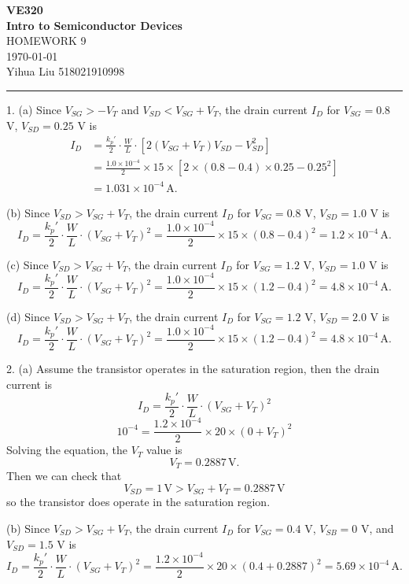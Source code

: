 \documentclass[a4paper]{article}
\begin{document}
\begin{center}
\huge
\textbf{VE320\\Intro to Semiconductor Devices\\}
\Large
\vspace{30pt}
\uppercase{Homework 9}\\
\vspace{5pt}\today\\
\vspace{5pt}
Yihua Liu 518021910998
\vspace{5pt}
\rule[-10pt]{.97\linewidth}{0.05em}
\end{center}
1. (a) Since $V_{SG}>-V_T$ and $V_{SD}<V_{SG}+V_T$, the drain current $I_D$ for $V_{SG}=0.8$ V, $V_{SD}=0.25$ V is
\[
    \begin{aligned}    
        I_D&=\frac{k_p'}{2}\cdot\frac{W}{L}\cdot\left[2\left(V_{SG}+V_T\right)V_{SD}-V_{SD}^2\right]\\
        &=\frac{1.0\times10^{-4}}{2}\times15\times\left[2\times\left(0.8-0.4\right)\times0.25-0.25^2\right]\\
        &=1.031\times10^{-4}\,\text{A}.
    \end{aligned}
\]

(b) Since $V_{SD}>V_{SG}+V_T$, the drain current $I_D$ for $V_{SG}=0.8$ V, $V_{SD}=1.0$ V is
\[I_D=\frac{k_p'}{2}\cdot\frac{W}{L}\cdot\left(V_{SG}+V_T\right)^2=\frac{1.0\times10^{-4}}{2}\times15\times\left(0.8-0.4\right)^2=1.2\times10^{-4}\,\text{A}.\]

(c) Since $V_{SD}>V_{SG}+V_T$, the drain current $I_D$ for $V_{SG}=1.2$ V, $V_{SD}=1.0$ V is
\[I_D=\frac{k_p'}{2}\cdot\frac{W}{L}\cdot\left(V_{SG}+V_T\right)^2=\frac{1.0\times10^{-4}}{2}\times15\times\left(1.2-0.4\right)^2=4.8\times10^{-4}\,\text{A}.\]

(d) Since $V_{SD}>V_{SG}+V_T$, the drain current $I_D$ for $V_{SG}=1.2$ V, $V_{SD}=2.0$ V is
\[I_D=\frac{k_p'}{2}\cdot\frac{W}{L}\cdot\left(V_{SG}+V_T\right)^2=\frac{1.0\times10^{-4}}{2}\times15\times\left(1.2-0.4\right)^2=4.8\times10^{-4}\,\text{A}.\]

2. (a) Assume the transistor operates in the saturation region, then the drain current is
\[I_D=\frac{k_p'}{2}\cdot\frac{W}{L}\cdot\left(V_{SG}+V_T\right)^2\]
\[10^{-4}=\frac{1.2\times10^{-4}}{2}\times20\times(0+V_T)^2\]
Solving the equation, the $V_T$ value is
\[V_T=0.2887\,\text{V}.\]
Then we can check that
\[V_{SD}=1\,\text{V}>V_{SG}+V_T=0.2887\,\text{V}\]
so the transistor does operate in the saturation region.

(b) Since $V_{SD}>V_{SG}+V_T$, the drain current $I_D$ for $V_{SG}=0.4$ V, $V_{SB}=0$ V, and $V_{SD}=1.5$ V is
\[I_D=\frac{k_p'}{2}\cdot\frac{W}{L}\cdot\left(V_{SG}+V_T\right)^2=\frac{1.2\times10^{-4}}{2}\times20\times\left(0.4+0.2887\right)^2=5.69\times10^{-4}\,\text{A}.\]
\end{document}

